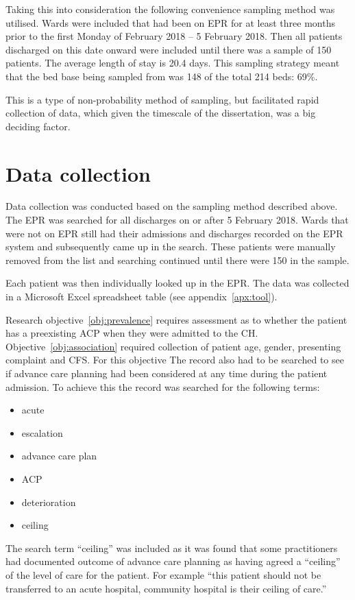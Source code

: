 \documentclass
[
	12pt,
	a4paper,
	oneside,
]{report}
\begin{document}
Taking this into consideration the following convenience sampling method was 
utilised. Wards were included that had been on EPR for at least three months
prior to the first Monday of February 2018 -- 5 February 2018. Then all patients
discharged on this date onward were included until there was a sample of 150
patients. The average length of stay is 20.4 days. This sampling strategy 
meant that the bed base being sampled from was 148 of the total 214 beds: 69\%.

This is a type of non-probability method of sampling, but facilitated rapid
collection of data, which given the timescale of the dissertation, was a big
deciding factor.

\section{Data collection}

Data collection was conducted based on the sampling method described above.
The EPR was searched for all discharges on or after 5 February 2018. Wards
that were not on EPR still had their admissions and discharges recorded on the
EPR system and subsequently came up in the search. These patients were 
manually removed from the list and searching continued until there were 150
in the sample.

Each patient was then individually looked up in the EPR. The data was
collected in a Microsoft Excel spreadsheet table (see appendix~\ref{apx:tool}).

Research objective~\ref{obj:prevalence} requires assessment as to whether the 
patient has a preexisting ACP when they were admitted to the CH. 
Objective~\ref{obj:association} required collection of patient age, gender,
presenting complaint and CFS.  
For this objective The record also had to be searched to see if advance care
planning had been considered at any time during the patient admission. To 
achieve this the record was searched for the following terms:

\begin{itemize}
\item acute
\item escalation
\item advance care plan
\item ACP
\item deterioration
\item ceiling
\end{itemize}

The search term ``ceiling'' was included as it was found that some practitioners
had documented outcome of advance care planning as having agreed a ``ceiling'' 
of the level of care for the patient. For example ``this patient should not be
transferred to an acute hospital, community hospital is their ceiling of care.''
\end{document}
